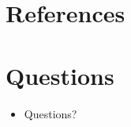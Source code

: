 \documentclass[8pt]{beamer}
\begin{document}
\section{References}
\begin{frame}[label=bibliography,allowframebreaks]{\secname}
\scriptsize
  
  
\end{frame}


\section{Questions}
\begin{frame}[allowframebreaks]{\secname}
\begin{itemize}
  \item Questions?
\end{itemize}
\end{frame}
\end{document}

